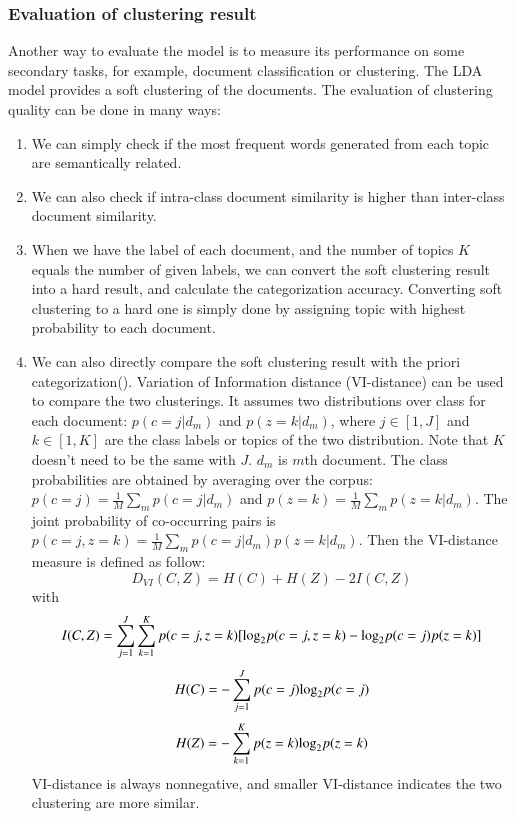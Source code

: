\documentclass{article} %
\begin{document}
\subsubsection{Evaluation of clustering result}
Another way to evaluate the model is to measure its performance on some secondary tasks, for example, document classification or clustering. The LDA model provides a soft clustering of the documents. The evaluation of clustering quality can be done in many ways: 
\begin{enumerate}
  \item  We can simply check if the most frequent words generated from each topic are semantically related.
  \item  We can also check if intra-class document similarity is higher than inter-class document similarity.
  \item  When we have the label of each document, and the number of topics $K$ equals the number of given labels, we can convert the soft clustering result into a hard result, and calculate the categorization accuracy. Converting soft clustering to a hard one is simply done by assigning topic with highest probability to each document. 
  \item We can also directly compare the soft clustering result with the priori categorization(\cite{gregor}). Variation of Information distance (VI-distance) can be used to compare the two clusterings. It assumes two distributions over class for each document: $p(c=j|d_{m})$ and $p(z = k|d_{m})$, where $j\in [1,J]$  and $k\in [1,K]$ are the class labels or topics of the two distribution. Note that $K$ doesn't need to be the same with $J$. $d_{m}$ is $m$th document. The class probabilities are obtained by averaging over the corpus:$p(c=j)=\frac{1}{M}\sum _{m}p(c=j|d_{m})$ and $p(z=k)=\frac{1}{M}\sum _{m}p(z=k|d_{m})$. The joint probability of co-occurring pairs is $p(c=j, z = k)=\frac{1}{M}\sum _{m}p(c=j|d_{m})p(z=k|d_{m})$. Then the VI-distance measure is defined as follow:
  \begin{equation}
D_{VI}(C,Z)=H(C)+H(Z)-2I(C,Z)
\end{equation}
with
  \begin{equation}
I(C,Z) = \sum_{j=1}^{J} \sum_{k=1}^{K}p(c=j,z=k)[\textup{log}_{2}p(c=j,z=k)-\textup{log}_{2}p(c=j)p(z=k)]
  \end{equation}
  \begin{equation}
H(C)=-\sum_{j=1}^{J} p(c=j)\textup{log}_{2}p(c=j)
    \end{equation}
  \begin{equation}
H(Z)=-\sum_{k=1}^{K} p(z=k)\textup{log}_{2}p(z=k)
    \end{equation}
    VI-distance is always nonnegative, and smaller VI-distance indicates the two clustering are more similar.
\end{enumerate}
\end{document}
